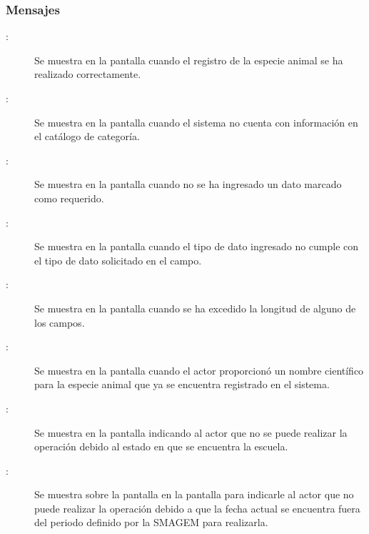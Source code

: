 \subsubsection{Mensajes}

    \begin{description}
      
	    \item [:] Se muestra en la pantalla  cuando el registro de la especie animal se ha realizado correctamente.	    
	    
	    \item [:] Se muestra en la pantalla  cuando el sistema no cuenta con información en el catálogo de categoría.
	    
	    \item [:] Se muestra en la pantalla  cuando no se ha ingresado un dato marcado como requerido.
	    
	     \item [:] Se muestra en la pantalla  cuando el tipo de dato ingresado no cumple con el tipo de dato solicitado en el campo.
	    
	    \item [:] Se muestra en la pantalla  cuando se ha excedido la longitud de alguno de los campos.
	    
	     \item [:] Se muestra en la pantalla  cuando el actor proporcionó un nombre científico  para la especie animal que ya se encuentra registrado en el sistema.
	     
	     \item[:] Se muestra en la pantalla  indicando al actor que no se puede realizar la operación debido al estado en que se encuentra la escuela.
	   
	   \item [:] Se muestra sobre la pantalla en la pantalla  para indicarle al actor que no puede realizar la operación debido a que la fecha actual se encuentra fuera del periodo definido por la SMAGEM para realizarla.
	    
    \end{description}
